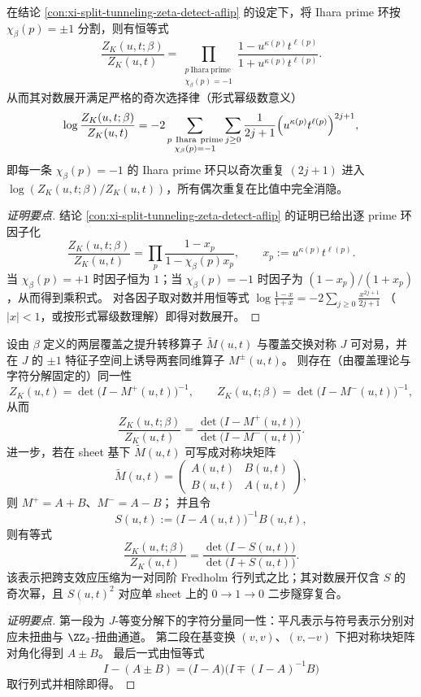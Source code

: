 \begin{conclusion}\label{con:xi-split-tunneling-odd-power-selection-law}
在结论 \ref{con:xi-split-tunneling-zeta-detect-aflip} 的设定下，将 Ihara prime 环按 \(\chi_\beta(p)=\pm 1\) 分割，则有恒等式
\[
\frac{Z_K(u,t;\beta)}{Z_K(u,t)}
=
\prod_{\substack{p\ \mathrm{Ihara\ prime}\\ \chi_\beta(p)=-1}}
\frac{1-u^{\kappa(p)}t^{\ell(p)}}{1+u^{\kappa(p)}t^{\ell(p)}}.
\]
从而其对数展开满足严格的奇次选择律（形式幂级数意义）
\[
\log\frac{Z_K(u,t;\beta)}{Z_K(u,t)}
=
-2\sum_{\substack{p\ \mathrm{Ihara\ prime}\\ \chi_\beta(p)=-1}}
\sum_{j\ge 0}\frac{1}{2j+1}\Bigl(u^{\kappa(p)}t^{\ell(p)}\Bigr)^{2j+1},
\]
即每一条 \(\chi_\beta(p)=-1\) 的 Ihara prime 环只以奇次重复 \((2j+1)\) 进入 \(\log(Z_K(u,t;\beta)/Z_K(u,t))\)，所有偶次重复在比值中完全消隐。
\end{conclusion}
\begin{proof}[证明要点]
结论 \ref{con:xi-split-tunneling-zeta-detect-aflip} 的证明已给出逐 prime 环因子化
\[
\frac{Z_K(u,t;\beta)}{Z_K(u,t)}=\prod_{p}\frac{1-x_p}{1-\chi_\beta(p)x_p},\qquad x_p:=u^{\kappa(p)}t^{\ell(p)}.
\]
当 \(\chi_\beta(p)=+1\) 时因子恒为 \(1\)；当 \(\chi_\beta(p)=-1\) 时因子为 \((1-x_p)/(1+x_p)\)，从而得到乘积式。
对各因子取对数并用恒等式
\(
\log\frac{1-x}{1+x}=-2\sum_{j\ge 0}\frac{x^{2j+1}}{2j+1}
\)
（\(|x|<1\)，或按形式幂级数理解）即得对数展开。
\end{proof}

\begin{conclusion}\label{con:xi-split-tunneling-z2-determinant-ratio}
设由 \(\beta\) 定义的两层覆盖之提升转移算子 \(\widetilde M(u,t)\) 与覆盖交换对称 \(J\) 可对易，并在 \(J\) 的 \(\pm1\) 特征子空间上诱导两套同维算子 \(M^{\pm}(u,t)\)。
则存在（由覆盖理论与字符分解固定的）同一性
\[
Z_K(u,t)=\det\bigl(I-M^{+}(u,t)\bigr)^{-1},
\qquad
Z_K(u,t;\beta)=\det\bigl(I-M^{-}(u,t)\bigr)^{-1},
\]
从而
\[
\frac{Z_K(u,t;\beta)}{Z_K(u,t)}
=
\frac{\det\bigl(I-M^{+}(u,t)\bigr)}{\det\bigl(I-M^{-}(u,t)\bigr)}.
\]
进一步，若在 sheet 基下 \(\widetilde M(u,t)\) 可写成对称块矩阵
\[
\widetilde M(u,t)=
\begin{pmatrix}
A(u,t) & B(u,t)\\
B(u,t) & A(u,t)
\end{pmatrix},
\]
则 \(M^{+}=A+B\)、\(M^{-}=A-B\)；
并且令
\[
S(u,t):=\bigl(I-A(u,t)\bigr)^{-1}B(u,t),
\]
则有等式
\[
\frac{Z_K(u,t;\beta)}{Z_K(u,t)}
=
\frac{\det\bigl(I-S(u,t)\bigr)}{\det\bigl(I+S(u,t)\bigr)}.
\]
该表示把跨支效应压缩为一对同阶 Fredholm 行列式之比；其对数展开仅含 \(S\) 的奇次幂，且 \(S(u,t)^2\) 对应单 sheet 上的 \(0\to1\to0\) 二步隧穿复合。
\end{conclusion}
\begin{proof}[证明要点]
第一段为 \(J\)-等变分解下的字符分量同一性：平凡表示与符号表示分别对应未扭曲与 \(\ZZ_2\)-扭曲通道。
第二段在基变换 \((v,v)\)、\((v,-v)\) 下把对称块矩阵对角化得到 \(A\pm B\)。
最后一式由恒等式
\[
I-(A\pm B)=\bigl(I-A\bigr)\bigl(I\mp (I-A)^{-1}B\bigr)
\]
取行列式并相除即得。
\end{proof}

